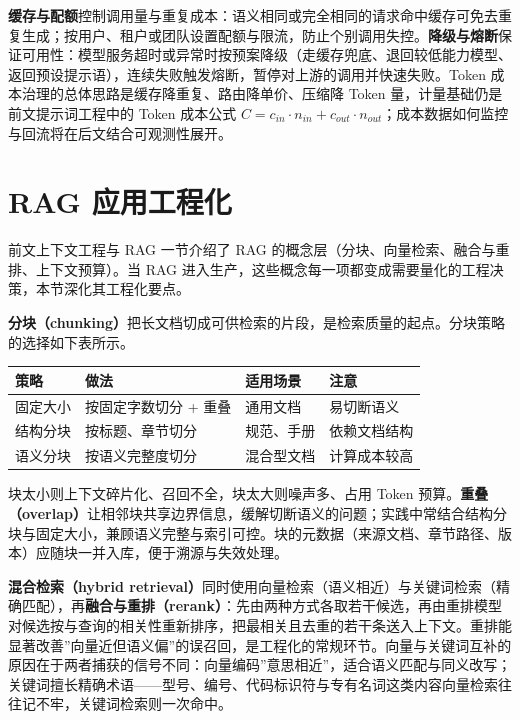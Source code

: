 \documentclass[12pt,a4paper,twoside,openany]{ctexbook}
\numberwithin{figure}{chapter}
\numberwithin{table}{chapter}
\newcounter{none}
\begin{document}
\textbf{缓存与配额}控制调用量与重复成本：语义相同或完全相同的请求命中缓存可免去重复生成；按用户、租户或团队设置配额与限流，防止个别调用失控。\textbf{降级与熔断}保证可用性：模型服务超时或异常时按预案降级（走缓存兜底、退回较低能力模型、返回预设提示语），连续失败触发熔断，暂停对上游的调用并快速失败。Token
成本治理的总体思路是缓存降重复、路由降单价、压缩降 Token
量，计量基础仍是前文提示词工程中的 Token 成本公式
\(C=c_{in}\cdot n_{in}+c_{out}\cdot n_{out}\)；成本数据如何监控与回流将在后文结合可观测性展开。

\section{RAG 应用工程化}\label{rag-ux5e94ux7528ux5de5ux7a0bux5316}

前文上下文工程与 RAG 一节介绍了 RAG
的概念层（分块、向量检索、融合与重排、上下文预算）。当 RAG
进入生产，这些概念每一项都变成需要量化的工程决策，本节深化其工程化要点。

\textbf{分块（chunking）}把长文档切成可供检索的片段，是检索质量的起点。分块策略的选择如下表所示。

{\def\LTcaptype{none} %
\begin{longtable}[]{@{}llll@{}}
\toprule\noalign{}
策略 & 做法 & 适用场景 & 注意 \\
\midrule\noalign{}
\endhead
\bottomrule\noalign{}
\endlastfoot
固定大小 & 按固定字数切分 + 重叠 & 通用文档 & 易切断语义 \\
结构分块 & 按标题、章节切分 & 规范、手册 & 依赖文档结构 \\
语义分块 & 按语义完整度切分 & 混合型文档 & 计算成本较高 \\
\end{longtable}
}

块太小则上下文碎片化、召回不全，块太大则噪声多、占用 Token
预算。\textbf{重叠（overlap）}让相邻块共享边界信息，缓解切断语义的问题；实践中常结合结构分块与固定大小，兼顾语义完整与索引可控。块的元数据（来源文档、章节路径、版本）应随块一并入库，便于溯源与失效处理。

\textbf{混合检索（hybrid
retrieval）}同时使用向量检索（语义相近）与关键词检索（精确匹配），再\textbf{融合与重排（rerank）}：先由两种方式各取若干候选，再由重排模型对候选按与查询的相关性重新排序，把最相关且去重的若干条送入上下文。重排能显著改善''向量近但语义偏''的误召回，是工程化的常规环节。向量与关键词互补的原因在于两者捕获的信号不同：向量编码''意思相近''，适合语义匹配与同义改写；关键词擅长精确术语------型号、编号、代码标识符与专有名词这类内容向量检索往往记不牢，关键词检索则一次命中。
\end{document}
